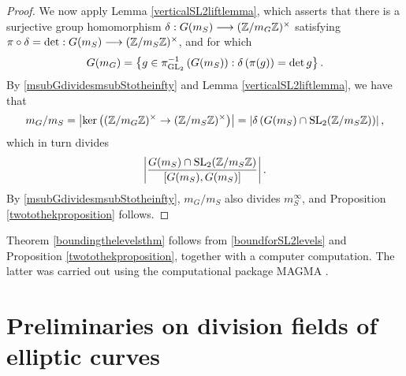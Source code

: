 \begin{proof}
We now apply Lemma \ref{verticalSL2liftlemma}, which asserts that there is a surjective group homomorphism $\delta : G(m_S) \longrightarrow (\mathbb{Z}/m_G\mathbb{Z})^\times$ satisfying $\pi \circ \delta = \det : G(m_S) \longrightarrow (\mathbb{Z}/m_S\mathbb{Z})^\times$, and for which
\[
G(m_G) = \left\{ g \in \pi_{\operatorname{GL}_2}^{-1}\left( G(m_S) \right) : \delta\left( \pi(g) \right) = \det g \right\}.
\]
By \eqref{msubGdividesmsubStotheinfty} and Lemma \ref{verticalSL2liftlemma}, we have that
\[
m_G/m_S = \left| \ker \left( (\mathbb{Z}/m_G\mathbb{Z})^\times \rightarrow (\mathbb{Z}/m_S\mathbb{Z})^\times \right) \right| = \left| \delta\left( G(m_S) \cap \operatorname{SL}_2(\mathbb{Z}/m_S\mathbb{Z}) \right) \right|,
\]
which in turn divides
\[
\left| \frac{G(m_S) \cap \operatorname{SL}_2(\mathbb{Z}/m_S\mathbb{Z})}{[G(m_S),G(m_S)]} \right|.
\]
By \eqref{msubGdividesmsubStotheinfty}, $m_G/m_S$ also divides $m_S^\infty$, and Proposition \ref{twotothekproposition} follows.
\end{proof}
Theorem \ref{boundingthelevelsthm} follows from \eqref{boundforSL2levels} and Proposition \ref{twotothekproposition}, together with a computer computation.  The latter was carried out using the computational package MAGMA \cite{MAGMA}.




\section{Preliminaries on division fields of elliptic curves} \label{preliminariesondivisionfieldssection}

